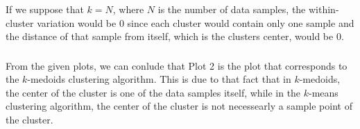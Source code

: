 \documentclass{article}
\begin{document}
\subsubsection{}
If we suppose that $k = N$, where $N$ is the number of data samples, the within-cluster variation would be 0 since each cluster would contain only one sample and the distance of that sample from itself, which is the clusters center, would be 0.

\subsubsection{}
From the given plots, we can conlude that Plot 2 is the plot that corresponds to the $k$-medoids clustering algorithm. This is due to that fact that in $k$-medoids, the center of the cluster is one of the data samples itself, while in the $k$-means clustering algorithm, the center of the cluster is not necessearly a sample point of the cluster.

\clearpage

% 
% 

\end{document}
